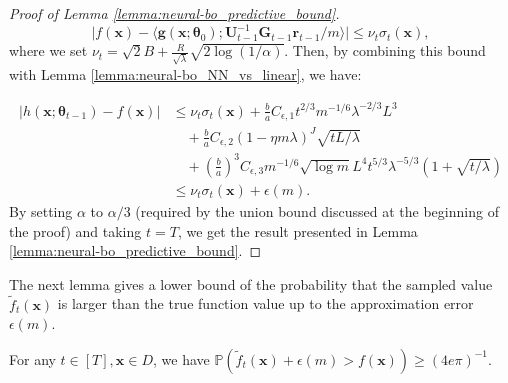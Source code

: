\begin{proof}[Proof of Lemma \ref{lemma:neural-bo_predictive_bound}]
\[\rvert f(\mathbf{x}) - \langle \mathbf{g}(\mathbf{x}; \boldsymbol{\theta}_0); \mathbf{U}^{-1}_{t-1} \mathbf{G}_{t-1} \mathbf{r}_{t-1}/m \rangle \lvert \leq \nu_t \sigma_t (\mathbf{x}), 
\]
where we set $\nu_t = \sqrt{2}B + \frac{R}{\sqrt{\lambda}}\sqrt{2 \log(1/ \alpha)}$. 
Then, by combining this bound with Lemma \ref{lemma:neural-bo_NN_vs_linear}, we have:

\begin{align*}
        \lvert h(\mathbf{x}; \boldsymbol{\theta}_{t-1}) - f(\mathbf{x}) \rvert & \leq \nu_t \sigma_t (\mathbf{x}) + \frac{b}{a} C_{\epsilon,1} t^{2/3}m^{-1/6} \lambda^{-2/3} L^3 \\ &
        \quad + \frac{b}{a} C_{\epsilon,2}(1 - \eta m \lambda)^J \sqrt{tL/\lambda} \\ &
        \quad +  \left(\frac{b}{a} \right)^3 C_{\epsilon,3} m^{-1/6} \sqrt{\log m} L^4 t^{5/3} \lambda ^{-5/3} \left(1 + \sqrt{t/\lambda}  \right) \\
        & \leq \nu_t \sigma_t (\mathbf{x}) + \epsilon(m).
\end{align*}
By setting $\alpha $ to $\alpha/3$ (required by the union bound discussed at the beginning of the proof) and taking $t=T$, we get the result presented in Lemma \ref{lemma:neural-bo_predictive_bound}.
\end{proof}

The next lemma gives a lower bound of the probability that the sampled value $\widetilde{f}_t (\mathbf{x})$ is larger than the true function value up to the approximation error $\epsilon(m)$.
\begin{lemma}
\label{lemma:neural-bo_sampled_value_vs_real_value}
For any $t \in [T], \mathbf{x} \in D$, we have $\mathbb{P}(\widetilde{f}_t (\mathbf{x}) + \epsilon(m) > f(\mathbf{x})) \geq (4e\pi)^{-1}$.
\end{lemma}

